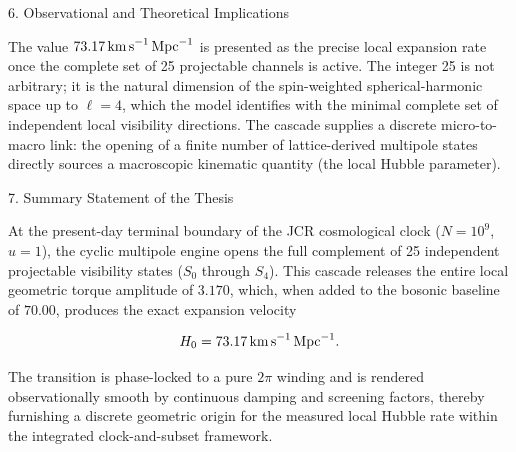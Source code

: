 6. Observational and Theoretical Implications

The value \(73.17\,{\rm km\,s}^{-1}\,{\rm Mpc}^{-1}\) is presented as the precise local expansion rate once the complete set of 25 projectable channels is active.
The integer 25 is not arbitrary; it is the natural dimension of the spin-weighted spherical-harmonic space up to \(\ell=4\), which the model identifies with the minimal complete set of independent local visibility directions.
The cascade supplies a discrete micro-to-macro link: the opening of a finite number of lattice-derived multipole states directly sources a macroscopic kinematic quantity (the local Hubble parameter).

7. Summary Statement of the Thesis

At the present-day terminal boundary of the JCR cosmological clock (\(N=10^9\), \(u=1\)), the cyclic multipole engine opens the full complement of 25 independent projectable visibility states (\(S_0\) through \(S_4\)). This cascade releases the entire local geometric torque amplitude of \(3.170\), which, when added to the bosonic baseline of \(70.00\), produces the exact expansion velocity

\[
H_0 = 73.17\,{\rm km\,s}^{-1}\,{\rm Mpc}^{-1}.
\]

The transition is phase-locked to a pure \(2\pi\) winding and is rendered observationally smooth by continuous damping and screening factors, thereby furnishing a discrete geometric origin for the measured local Hubble rate within the integrated clock-and-subset framework.
